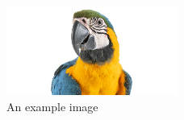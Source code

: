 \documentclass{article}
\begin{document}
\lipsum[1-7]
\begin{figure}[H]
\centering
\includegraphics[width=0.5\textwidth]{figs/example-image}
\caption{An example image}
\end{figure}
\lipsum[8-15]
\end{document}
